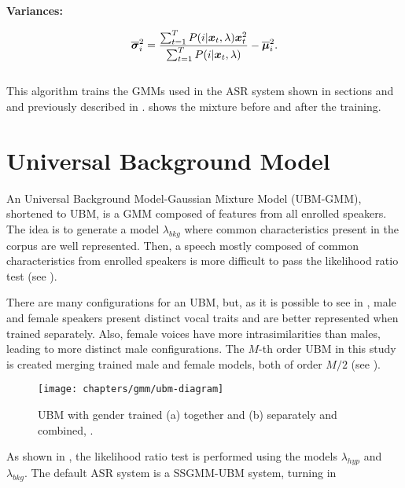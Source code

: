 \noindent\textbf{Variances:}

\begin{equation}
    \overline{\dvec{\sigma}}_i^2 = \frac{\sum_{t=1}^T \postprob{i}{\dvec{x}_t, \lambda} \dvec{x}_t^2}{\sum_{t=1}^T \postprob{i}{\dvec{x}_t, \lambda}} - \overline{\dvec{\mu}}_i^2.
    \label{eq:m-step-variances}
\end{equation}
\\

This algorithm trains the GMMs used in the ASR system shown in sections  and  and previously described in .  shows the mixture before and after the training.

\section{Universal Background Model}
\label{sec:ubm}

An Universal Background Model-Gaussian Mixture Model (UBM-GMM), shortened to UBM, is a GMM composed of features from all enrolled speakers. The idea is to generate a model $\lambda_{bkg}$ where common characteristics present in the corpus are well represented. Then, a speech mostly composed of common characteristics from enrolled speakers is more difficult to pass the likelihood ratio test (see ).

There are many configurations for an UBM, but, as it is possible to see in , male and female speakers present distinct vocal traits and are better represented when trained separately. Also, female voices have more intrasimilarities than males, leading to more distinct male configurations. The $M$-th order UBM in this study is created merging trained male and female models, both of order $M/2$ (see ).

\begin{figure}[ht]
    \centering
    \texttt{[image: chapters/gmm/ubm-diagram]}
    \caption{UBM with gender trained (a) together and (b) separately and combined, .}
    \label{fig:ubm-diagram}
\end{figure}

As shown in , the likelihood ratio test is performed using the models $\lambda_{hyp}$ and $\lambda_{bkg}$. The default ASR system is a SSGMM-UBM system, turning  in

